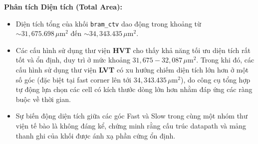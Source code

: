 \documentclass[12pt,a4paper,oneside]{book}
\begin{document}
\begin{table}[H]
\centering
{}
\caption{Tổng hợp thông số Diện tích và Công suất của khối BRAM CTV qua các process corners.}
\end{table}

\textbf{Phân tích Diện tích (Total Area):}
\begin{itemize}
    \item Diện tích tổng của khối \texttt{bram\_ctv} dao động trong khoảng từ $\sim 31,675.698\,\mu\text{m}^2$ đến $\sim 34,343.435\,\mu\text{m}^2$.
    \item Các cấu hình sử dụng thư viện \textbf{HVT} cho thấy khả năng tối ưu diện tích rất tốt và ổn định, duy trì ở mức khoảng $31,675 - 32,087\,\mu\text{m}^2$. Trong khi đó, các cấu hình sử dụng thư viện \textbf{LVT} có xu hướng chiếm diện tích lớn hơn ở một số góc (đặc biệt tại fast corner lên tới $34,343.435\,\mu\text{m}^2$), do công cụ tổng hợp tự động lựa chọn các cell có kích thước dòng lớn hơn nhằm đáp ứng các ràng buộc về thời gian.
    \item Sự biến động diện tích giữa các góc Fast và Slow trong cùng một nhóm thư viện tế bào là không đáng kể, chứng minh rằng cấu trúc datapath và mảng thanh ghi của khối được ánh xạ phần cứng ổn định.
\end{itemize}
\end{document}
